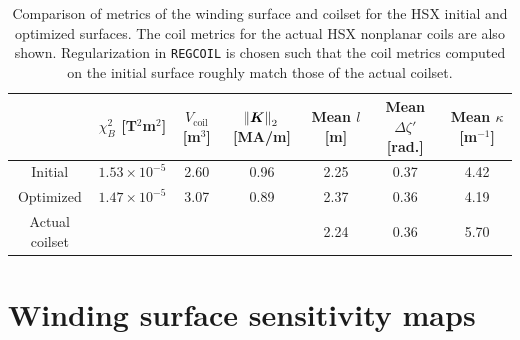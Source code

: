\documentclass[aps,unsortedaddress]{revtex4-1}
\begin{document}
\begin{table}
\renewcommand{\arraystretch}{1.4}
\begin{tabular} {| c | c | c | c | c | c | c |}
\hline
& $\chi^2_B$ [T$^2$m$^2$] & $V_{\text{coil}}$[m$^3$] & $\norm{\bm{K}}_2$ [MA/m] & Mean $l$ [m] & Mean $\Delta \zeta'$ [rad.] & Mean $\kappa$ [m$^{-1}$] \\ \hline 
Initial & $1.53\times10^{-5}$ & 2.60 & 0.96 & 2.25 & 0.37 & 4.42 \\ \hline
Optimized & $1.47\times10^{-5}$ & 3.07 & 0.89 & 2.37 & 0.36 & 4.19 \\ \hline
Actual coilset & & & & 2.24 & 0.36 & 5.70 \\ \hline
\end{tabular}
\caption{Comparison of metrics of the winding surface and coilset for the HSX initial and optimized surfaces. The coil metrics for the actual HSX nonplanar coils are also shown. Regularization in \texttt{REGCOIL} is chosen such that the coil metrics computed on the initial surface roughly match those of the actual coilset.}
\label{table_hsx}
\end{table}

\FloatBarrier
\section{Winding surface sensitivity maps}
\label{sect_sensitivity}
\end{document}
